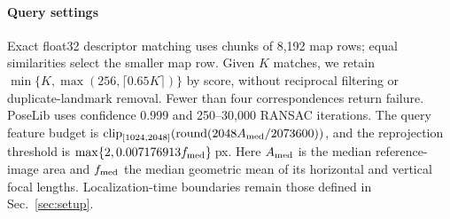 \paragraph{Query settings}
Exact float32 descriptor matching uses chunks of 8,192 map rows; equal similarities select the smaller map row. Given $K$ matches, we retain $\min\{K,\max(256,\lceil0.65K\rceil)\}$ by score, without reciprocal filtering or duplicate-landmark removal. Fewer than four correspondences return failure. PoseLib uses confidence 0.999 and 250--30,000 RANSAC iterations. The query feature budget is $\operatorname{clip}_{[1024,2048]}(\operatorname{round}(2048A_{\rm med}/2073600))$, and the reprojection threshold is $\max\{2,0.007176913f_{\rm med}\}$\,px. Here $A_{\rm med}$ is the median reference-image area and $f_{\rm med}$ the median geometric mean of its horizontal and vertical focal lengths. Localization-time boundaries remain those defined in Sec.~\ref{sec:setup}.
